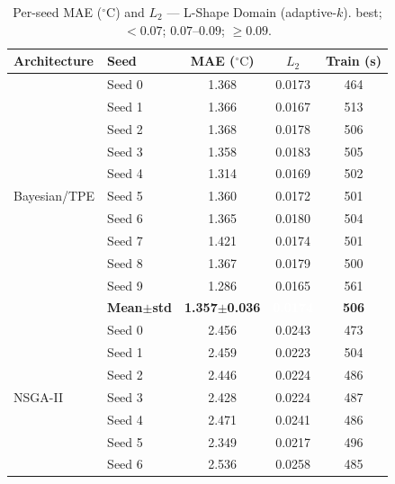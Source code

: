 \begin{table}[H]
\centering\small\setlength{\tabcolsep}{4pt}
\caption{Per-seed MAE ($^\circ\mathrm{C}$) and $L_2$ --- L-Shape Domain (adaptive-$k$).
\phantom{x} best; \phantom{x} ${<}0.07$; \phantom{x} $0.07$--$0.09$; \phantom{x} ${\geq}0.09$.}
\label{tab:adap_lshape_seeds}
\begin{tabular}{@{}llccc@{}}
\toprule
Architecture & Seed & MAE ($^\circ\mathrm{C}$) & $L_2$ & Train (s) \\
\midrule
\multirow{11}{*}{Bayesian/TPE}
  & Seed 0 & {\small 1.368} & {\small 0.0173} & {\small 464} \\
  & Seed 1 & {\small 1.366} & {\small 0.0167} & {\small 513} \\
  & Seed 2 & {\small 1.368} & {\small 0.0178} & {\small 506} \\
  & Seed 3 & {\small 1.358} & {\small 0.0183} & {\small 505} \\
  & Seed 4 & {\small 1.314} & {\small 0.0169} & {\small 502} \\
  & Seed 5 & {\small 1.360} & {\small 0.0172} & {\small 501} \\
  & Seed 6 & {\small 1.365} & {\small 0.0180} & {\small 504} \\
  & Seed 7 & {\small 1.421} & {\small 0.0174} & {\small 501} \\
  & Seed 8 & {\small 1.367} & {\small 0.0179} & {\small 500} \\
  & Seed 9 & {\small 1.286} & {\small 0.0165} & {\small 561} \\
  & \textbf{Mean$\pm$std} & \textbf{1.357$\pm$0.036} & \cellcolor{ForestGreen!55}\textcolor{white}{\textbf{0.0174}} & \textbf{506} \\
\midrule
\multirow{11}{*}{NSGA-II}
  & Seed 0 & {\small 2.456} & {\small 0.0243} & {\small 473} \\
  & Seed 1 & {\small 2.459} & {\small 0.0223} & {\small 504} \\
  & Seed 2 & {\small 2.446} & {\small 0.0224} & {\small 486} \\
  & Seed 3 & {\small 2.428} & {\small 0.0224} & {\small 487} \\
  & Seed 4 & {\small 2.471} & {\small 0.0241} & {\small 486} \\
  & Seed 5 & {\small 2.349} & {\small 0.0217} & {\small 496} \\
  & Seed 6 & {\small 2.536} & {\small 0.0258} & {\small 485} \\

\end{tabular}
\end{table}
